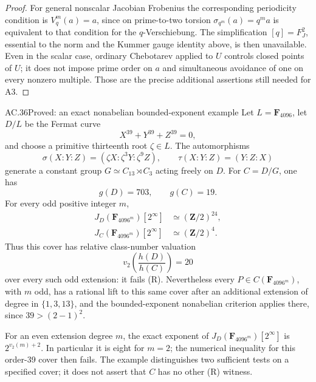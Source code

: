 \begin{proof}
For general nonscalar Jacobian Frobenius the corresponding
periodicity condition is \(V_q^m(a)=a\), since on prime-to-two
torsion \(\sigma_{q^m}(a)=q^m a\) is equivalent to that
condition for the \(q\)-Verschiebung.
The simplification \([q]=F_J^2\), essential to the norm
and the Kummer gauge identity above, is then unavailable.
Even in the scalar case, ordinary Chebotarev applied to
\(U\) controls closed points of \(U\); it does not impose
prime order on \(a\) and simultaneous avoidance of one
on every nonzero multiple. Those are the precise additional
assertions still needed for A3.
\end{proof}


\begin{claim}{AC.36}{Proved: an exact nonabelian bounded-exponent example}
Let \(L=\mathbf F_{4096}\), let \(D/L\) be the Fermat curve
\[
                         X^{39}+Y^{39}+Z^{39}=0,
\]
and choose a primitive thirteenth root \(\zeta\in L\).
The automorphisms
\[
 \sigma(X:Y:Z)=(\zeta X:\zeta^3Y:\zeta^9Z),
 \qquad \tau(X:Y:Z)=(Y:Z:X)
\]
generate a constant group \(G\simeq C_{13}\rtimes C_3\)
acting freely on \(D\). For \(C=D/G\), one has
\[
                  g(D)=703,\qquad g(C)=19.
\]
For every odd positive integer \(m\),
\[
 \begin{aligned}
 J_D(\mathbf F_{4096^m})[2^\infty]
                  &\simeq(\mathbf Z/2)^{24},\\
 J_C(\mathbf F_{4096^m})[2^\infty]
                  &\simeq(\mathbf Z/2)^4.
 \end{aligned}
\]
Thus this cover has relative class-number valuation
\[
             v_2\!\left(\frac{h(D)}{h(C)}\right)=20
\]
over every such odd extension: it fails (R).
Nevertheless every \(P\in C(\mathbf F_{4096^m})\), with
\(m\) odd, has a rational lift to this same cover after
an additional extension of degree in \(\{1,3,13\}\),
and the bounded-exponent nonabelian criterion applies there,
since \(39>(2-1)^2\).

For an even extension degree \(m\), the exact exponent of
\(J_D(\mathbf F_{4096^m})[2^\infty]\) is
\(2^{v_2(m)+2}\). In particular it is eight for \(m=2\);
the numerical inequality for this order-39 cover then fails.
The example distinguishes two sufficient tests on a specified
cover; it does not assert that \(C\) has no other (R) witness.
\end{claim}
